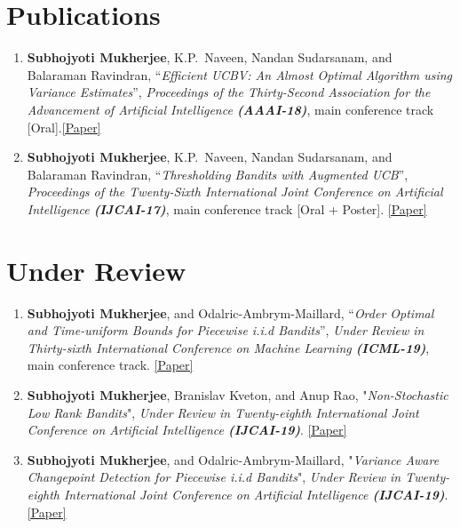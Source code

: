 \documentclass[margin,11pt]{res}
\begin{document}
\begin{resume}
\section{Publications}
\begin{enumerate}[leftmargin=*]
\item \textbf{Subhojyoti Mukherjee}, K.P.~Naveen, Nandan Sudarsanam, and Balaraman Ravindran, ``\textit{Efficient UCBV: An Almost Optimal Algorithm using Variance Estimates}'', \textit{Proceedings of the Thirty-Second Association for the Advancement of Artificial Intelligence \textbf{(AAAI-18)}}, main conference track [Oral].\href{https://www.aaai.org/ocs/index.php/AAAI/AAAI18/paper/view/16111}{[Paper]}
\item \textbf{Subhojyoti Mukherjee}, K.P.~Naveen, Nandan Sudarsanam, and Balaraman Ravindran, ``\textit{Thresholding Bandits with Augmented UCB}'', \textit{Proceedings of the Twenty-Sixth International Joint Conference on Artificial Intelligence \textbf{(IJCAI-17)}}, main conference track [Oral + Poster]. \href{https://www.ijcai.org/proceedings/2017/0350.pdf}{[Paper]}
\end{enumerate}

\section{Under Review}
\begin{enumerate}
\item \textbf{Subhojyoti Mukherjee}, and Odalric-Ambrym-Maillard, ``\textit{Order Optimal and Time-uniform Bounds for Piecewise i.i.d Bandits}'', \textit{Under Review in Thirty-sixth International Conference on Machine Learning  \textbf{(ICML-19)}}, main conference track. \href{https://github.com/Subhojyoti/INRIA_Intern/blob/master/ICML2019/paper.pdf}{[Paper]}
\item \textbf{Subhojyoti Mukherjee}, Branislav Kveton, and Anup Rao, "\textit{Non-Stochastic Low Rank Bandits}", \textit{Under Review in Twenty-eighth International Joint Conference on Artificial Intelligence \textbf{(IJCAI-19)}}. \href{https://github.com/Subhojyoti/Latent_Bandits/blob/master/IJCAI2019/bandit_paper.pdf}{[Paper]}
\item \textbf{Subhojyoti Mukherjee}, and Odalric-Ambrym-Maillard, "\textit{Variance Aware Changepoint Detection for Piecewise i.i.d Bandits}", \textit{Under Review in Twenty-eighth International Joint Conference on Artificial Intelligence \textbf{(IJCAI-19)}}. \href{https://github.com/Subhojyoti/INRIA_Intern/blob/master/IJCAI\%202019/ijcai19.pdf}{[Paper]}
\end{enumerate}


\end{resume}
\end{document}
